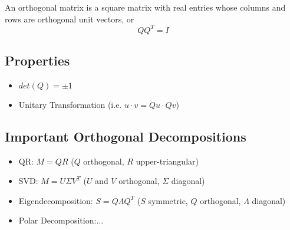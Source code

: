 \documentclass[../main.tex]{subfiles}
\begin{document}
\begin{definition}
An orthogonal matrix is a square matrix with real entries whose columns and rows are orthogonal unit vectors, or
\begin{equation}
QQ^T = I
\end{equation}
\end{definition}

\subsection{Properties}
\begin{itemize}
	\item $det(Q) = \pm 1$
    \item Unitary Transformation (i.e. $u\cdot v = Qu \cdot Qv$)
\end{itemize}
\subsection{Important Orthogonal Decompositions}
\begin{itemize}
	\item QR: $M=QR$ ($Q$ orthogonal, $R$ upper-triangular)
    \item SVD: $M = U\Sigma V^T$ ($U$ and $V$ orthogonal, $\Sigma$ diagonal)
    \item Eigendecomposition: $S = Q\Lambda Q^T$ ($S$ symmetric, $Q$ orthogonal, $\Lambda$ diagonal)
    \item Polar Decomposition:$\ldots$
\end{itemize}
\end{document}

